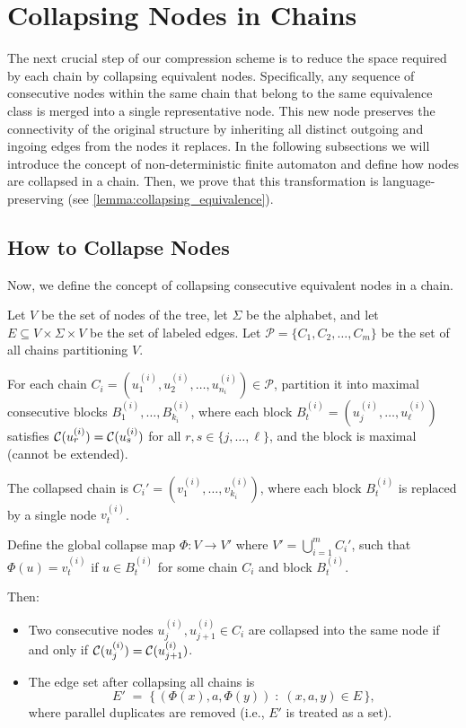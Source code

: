 \section{Collapsing Nodes in Chains} \label{sec:collapsing}
The next crucial step of our compression scheme is to reduce the space required by each chain by collapsing equivalent nodes. Specifically, any sequence of consecutive nodes within the same chain that belong to the same equivalence class is merged into a single representative node. This new node preserves the connectivity of the original structure by inheriting all distinct outgoing and ingoing edges from the nodes it replaces. In the following subsections we will introduce the concept of non-deterministic finite automaton and define how nodes are collapsed in a chain. Then, we prove that this transformation is language-preserving (see \cref{lemma:collapsing_equivalence}).

\subsection{How to Collapse Nodes}
Now, we define the concept of collapsing consecutive equivalent nodes in a chain.
\begin{definition}
    \label{def:collapsing}
    Let $V$ be the set of nodes of the tree, let $\Sigma$ be the alphabet, and let $E \subseteq V \times \Sigma \times V$ be the set of labeled edges.
    Let $\mathcal{P} = \{C_1, C_2, \ldots, C_m\}$ be the set of all chains partitioning $V$.
    
    For each chain $C_i = (u_1^{(i)}, u_2^{(i)}, \ldots, u_{n_i}^{(i)}) \in \mathcal{P}$, partition it into maximal consecutive blocks $B_1^{(i)}, \ldots, B_{k_i}^{(i)}$, where each block $B_t^{(i)} = (u_j^{(i)}, \ldots, u_\ell^{(i)})$ satisfies $\mathcal{C}(u_r^{(i)}) = \mathcal{C}(u_s^{(i)})$ for all $r,s \in \{j,\ldots,\ell\}$, and the block is maximal (cannot be extended).

    The collapsed chain is $C_i' = (v_1^{(i)}, \ldots, v_{k_i}^{(i)})$, where each block $B_t^{(i)}$ is replaced by a single node $v_t^{(i)}$.
    
    Define the global collapse map $\Phi: V \to V'$ where $V' = \bigcup_{i=1}^m C_i'$, such that $\Phi(u) = v_t^{(i)}$ if $u \in B_t^{(i)}$ for some chain $C_i$ and block $B_t^{(i)}$.
    
    Then:
    \begin{itemize}[leftmargin=25pt]
        \item Two consecutive nodes $u_j^{(i)}, u_{j+1}^{(i)} \in C_i$ are collapsed into the same node if and only if $\mathcal{C}(u_j^{(i)}) = \mathcal{C}(u_{j+1}^{(i)})$.
        \item The edge set after collapsing all chains is
        \[
            E' \;=\; \{\, (\Phi(x), a, \Phi(y)) \;:\; (x,a,y) \in E \,\},
        \]
        where parallel duplicates are removed (i.e., $E'$ is treated as a set).
    \end{itemize}
\end{definition}

